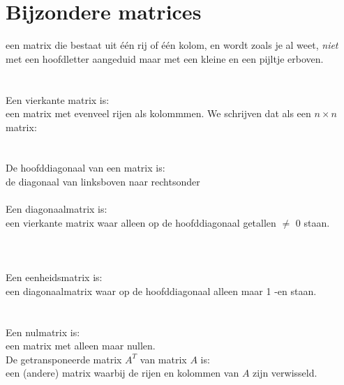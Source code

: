 \section{Bijzondere matrices}
{een matrix die bestaat uit één rij of één  kolom, en wordt zoals je al weet, \textit{niet} met een hoofdletter aangeduid maar met een kleine en een pijltje erboven.}\\
\\ \\
{Een vierkante matrix is:
	\\een matrix met evenveel rijen als kolommmen. We schrijven dat als een $ n \times n $ matrix:} 
  \\ \\ \\
{De hoofddiagonaal van een matrix is:
	\\de diagonaal van linksboven naar rechtsonder}
\\ \\ 
{Een diagonaalmatrix is:\\een vierkante matrix waar alleen op de hoofddiagonaal getallen $\ne$ 0 staan. }
\\ \\ \\ \\
{Een eenheidsmatrix  is:\\een diagonaalmatrix waar  op de hoofddiagonaal alleen maar 1 -en  staan. }
\\ \\ \\
{Een nulmatrix  is: \\een matrix met alleen maar nullen. }
 \\ 
{De getransponeerde matrix $ A^{T}  $ van matrix $A$ is:\\
	een (andere) matrix waarbij de rijen en kolommen van $A$ zijn verwisseld. } 
 \\ \\ \\ \\
\\
